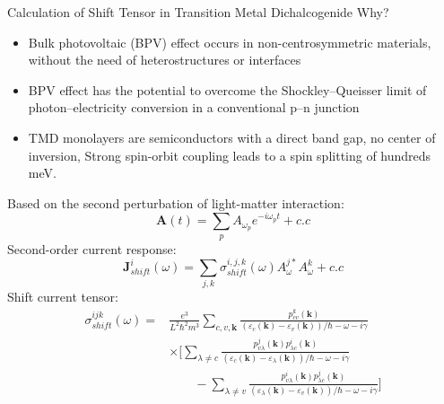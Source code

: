 \documentclass{beamer}
\begin{document}
\begin{frame}{Calculation of Shift Tensor in Transition Metal Dichalcogenide}
Why?
\begin{itemize}
\item Bulk photovoltaic (BPV) effect occurs in non-centrosymmetric materials, without the need of heterostructures or interfaces
\item BPV effect has the potential to overcome the Shockley–Queisser limit of photon–electricity conversion in a conventional p–n junction
\item TMD monolayers are semiconductors with a direct band gap, no center of inversion, Strong spin-orbit coupling leads to a spin splitting of hundreds meV.
\end{itemize}
\end{frame}
\begin{frame}
Based on the second perturbation of light-matter interaction:
$$\textbf{A}(t) = \sum_p A_{\omega_p} e^{-i\omega_p t} + c.c$$
Second-order current response:
\begin{equation*}
\textbf{J}^i_{shift} (\omega)= \sum_{j,k} \sigma^{i,j,k}_{shift}(\omega) A^{j*}_\omega A^k_\omega +c.c
\end{equation*}
Shift current tensor:
\begin{align}
	\sigma^{ijk}_{shift}(\omega) =& \frac{e^3}{L^2 \hbar^2 m^3} \sum_{c,v,\textbf{k}} \frac{p^k_{cv}(\textbf{k})}{(\varepsilon_c(\textbf{k}) - \varepsilon_v(\textbf{k}))/\hbar -\omega -i\gamma}\nonumber\\
	&\times \bigg[\sum_{\lambda \neq c} \frac{p^{j}_{v\lambda}(\textbf{k})p^{i}_{\lambda c}(\textbf{k})}{(\varepsilon_c(\textbf{k}) - \varepsilon_\lambda(\textbf{k}))/\hbar -\omega -i\gamma} \nonumber\\&\qquad - \sum_{\lambda \neq v} \frac{p^{i}_{v\lambda}(\textbf{k})p^{j}_{\lambda c}(\textbf{k})}{(\varepsilon_\lambda(\textbf{k}) - \varepsilon_v(\textbf{k}))/\hbar -\omega -i\gamma} \bigg] 
\end{align}
\end{frame}
\end{document}
